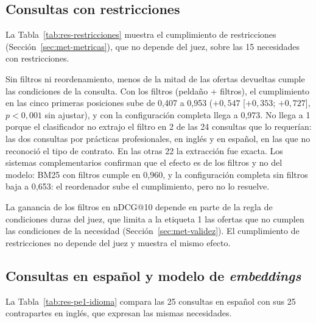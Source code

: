 \subsection{Consultas con restricciones}

La Tabla~\ref{tab:res-restricciones} muestra el cumplimiento de restricciones (Sección~\ref{sec:met-metricas}), que no depende del juez, sobre las 15 necesidades con restricciones.



Sin filtros ni reordenamiento, menos de la mitad de las ofertas devueltas cumple las condiciones de la consulta. Con los filtros (peldaño + filtros), el cumplimiento en las cinco primeras posiciones sube de 0,407 a 0,953 ($+0{,}547$ [$+0{,}353$; $+0{,}727$], $p < 0{,}001$ sin ajustar), y con la configuración completa llega a 0,973. No llega a 1 porque el clasificador no extrajo el filtro en 2 de las 24 consultas que lo requerían: las dos consultas por prácticas profesionales, en inglés y en español, en las que no reconoció el tipo de contrato. En las otras 22 la extracción fue exacta. Los sistemas complementarios confirman que el efecto es de los filtros y no del modelo: BM25 con filtros cumple en 0,960, y la configuración completa sin filtros baja a 0,653: el reordenador sube el cumplimiento, pero no lo resuelve.

La ganancia de los filtros en nDCG@10 depende en parte de la regla de condiciones duras del juez, que limita a la etiqueta 1 las ofertas que no cumplen las condiciones de la necesidad (Sección~\ref{sec:met-validez}). El cumplimiento de restricciones no depende del juez y muestra el mismo efecto.

\subsection{Consultas en español y modelo de \textit{embeddings}}

La Tabla~\ref{tab:res-pe1-idioma} compara las 25 consultas en español con sus 25 contrapartes en inglés, que expresan las mismas necesidades.



